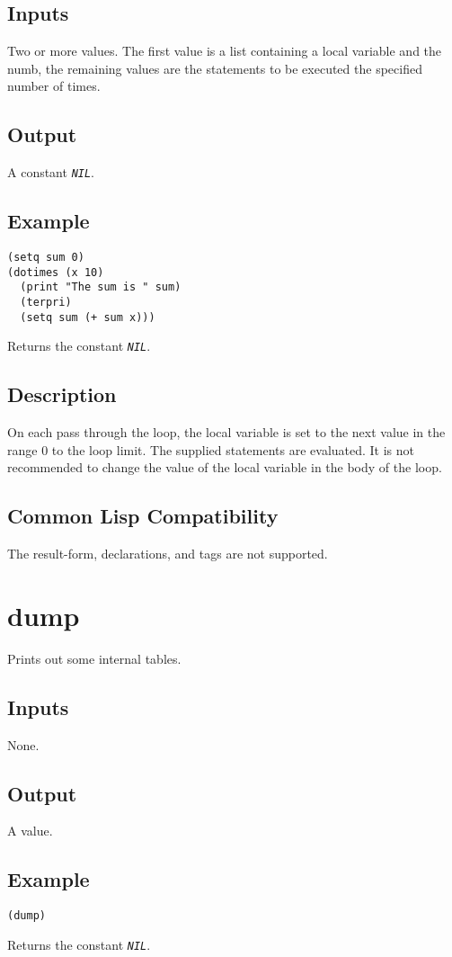 \documentclass[10pt, openany]{book}
\newcommand{\constant}[1]{\emph{\texttt{#1}}}
\begin{document}
\subsection{Inputs}
Two or more values.  The first value is a list containing a local variable and the numb, the remaining values are the statements to be executed the specified number of times.
\subsection{Output}
A constant \constant{NIL}.
\subsection{Example}
\begin{lstlisting}
(setq sum 0)
(dotimes (x 10)
  (print "The sum is " sum)
  (terpri)
  (setq sum (+ sum x)))
\end{lstlisting}
Returns the constant \constant{NIL}.
\subsection{Description}
On each pass through the loop, the local variable is set to the next value in the range 0 to the loop limit.  The supplied statements are evaluated.  It is not recommended to change the value of the local variable in the body of the loop.
\subsection{Common Lisp Compatibility}
The result-form, declarations, and tags are not supported.

\section{dump}
Prints out some internal tables.
\subsection{Inputs}
None.
\subsection{Output}
A value.
\subsection{Example}
\begin{lstlisting}
(dump)
\end{lstlisting}
Returns the constant \constant{NIL}.
\end{document}
